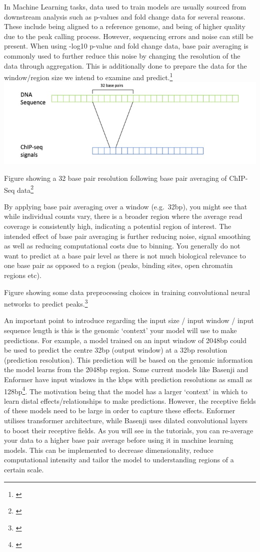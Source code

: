 \documentclass[
]{book}
\begin{document}
In Machine Learning tasks, data used to train models are usually sourced from downstream analysis such as p-values and fold change data for several reasons. These include being aligned to a reference genome, and being of higher quality due to the peak calling process. However, sequencing errors and noise can still be present. When using -log10 p-value and fold change data, base pair averaging is commonly used to further reduce this noise by changing the resolution of the data through aggregation. This is additionally done to prepare the data for the window/region size we intend to examine and predict.\footnote{\citet{li2022}}
\includegraphics{images/bp_resolution.png}

Figure showing a 32 base pair resolution following base pair averaging of ChIP-Seq data\footnote{\citet{patel2024}}

By applying base pair averaging over a window (e.g.~32bp), you might see that while individual counts vary, there is a broader region where the average read coverage is consistently high, indicating a potential region of interest. The intended effect of base pair averaging is further reducing noise, signal smoothing as well as reducing computational costs due to binning. You generally do not want to predict at a base pair level as there is not much biological relevance to one base pair as opposed to a region (peaks, binding sites, open chromatin regions etc).

Figure showing some data preprocessing choices in training convolutional neural networks to predict peaks.\footnote{\citet{toneyan2022}}

An important point to introduce regarding the input size / input window / input sequence length is this is the genomic `context' your model will use to make predictions. For example, a model trained on an input window of 2048bp could be used to predict the centre 32bp (output window) at a 32bp resolution (prediction resolution). This prediction will be based on the genomic information the model learns from the 2048bp region. Some current models like Basenji and Enformer have input windows in the kbps with prediction resolutions as small as 128bp\footnote{\citet{avsec2021}}. The motivation being that the model has a larger `context' in which to learn distal effects/relationships to make predictions. However, the receptive fields of these models need to be large in order to capture these effects. Enformer utilises transformer architecture, while Basenji uses dilated convolutional layers to boost their receptive fields. As you will see in the tutorials, you can re-average your data to a higher base pair average before using it in machine learning models. This can be implemented to decrease dimensionality, reduce computational intensity and tailor the model to understanding regions of a certain scale.
\end{document}
